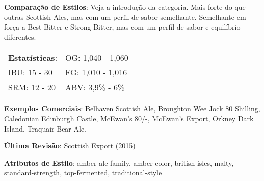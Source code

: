 \textbf{Comparação de Estilos}: Veja a introdução da categoria. Mais forte do que outras Scottish Ales, mas com um perfil de sabor semelhante. Semelhante em força a Best Bitter e Strong Bitter, mas com um perfil de sabor e equilíbrio diferentes.

\begin{tabular}{@{}p{35mm}p{35mm}@{}}
  \textbf{Estatísticas}: & OG: 1,040 - 1,060 \\
  IBU: 15 - 30  & FG: 1,010 - 1,016 \\
  SRM: 12 - 20  & ABV: 3,9\% - 6\%
\end{tabular}

\textbf{Exemplos Comerciais}: Belhaven Scottish Ale, Broughton Wee Jock 80 Shilling, Caledonian Edinburgh Castle, McEwan’s 80/-, McEwan’s Export, Orkney Dark Island, Traquair Bear Ale.

\textbf{Última Revisão}: Scottish Export (2015)

\textbf{Atributos de Estilo}: amber-ale-family, amber-color, british-isles, malty, standard-strength, top-fermented, traditional-style
